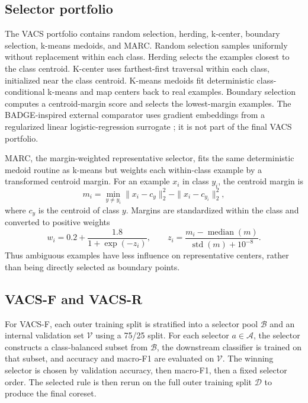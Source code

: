 \documentclass[12pt]{article}
\newcommand{\D}{\mathcal{D}}
\newcommand{\Aset}{\mathcal{A}}
\newcommand{\Bset}{\mathcal{B}}
\newcommand{\Vset}{\mathcal{V}}
\begin{document}
\subsection*{Selector portfolio}

The VACS portfolio contains random selection, herding, k-center, boundary selection, k-means medoids, and MARC. Random selection samples uniformly without replacement within each class. Herding selects the examples closest to the class centroid. K-center uses farthest-first traversal within each class, initialized near the class centroid. K-means medoids fit deterministic class-conditional k-means and map centers back to real examples. Boundary selection computes a centroid-margin score and selects the lowest-margin examples. The BADGE-inspired external comparator uses gradient embeddings from a regularized linear logistic-regression surrogate \citep{ash2020deep}; it is not part of the final VACS portfolio.

MARC, the margin-weighted representative selector, fits the same deterministic medoid routine as k-means but weights each within-class example by a transformed centroid margin. For an example $x_i$ in class $y_i$, the centroid margin is
\begin{equation}
m_i=\min_{y \neq y_i}\|x_i-c_y\|_2^2-\|x_i-c_{y_i}\|_2^2,
\end{equation}
where $c_y$ is the centroid of class $y$. Margins are standardized within the class and converted to positive weights
\begin{equation}
w_i=0.2+\frac{1.8}{1+\exp(-z_i)}, \qquad
z_i=\frac{m_i-\operatorname{median}(m)}{\operatorname{std}(m)+10^{-8}}.
\end{equation}
Thus ambiguous examples have less influence on representative centers, rather than being directly selected as boundary points.

\subsection*{VACS-F and VACS-R}

For VACS-F, each outer training split is stratified into a selector pool $\Bset$ and an internal validation set $\Vset$ using a 75/25 split. For each selector $a \in \Aset$, the selector constructs a class-balanced subset from $\Bset$, the downstream classifier is trained on that subset, and accuracy and macro-F1 are evaluated on $\Vset$. The winning selector is chosen by validation accuracy, then macro-F1, then a fixed selector order. The selected rule is then rerun on the full outer training split $\D$ to produce the final coreset.
\end{document}
